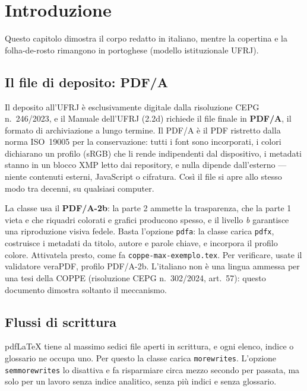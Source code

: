 \documentclass[italian,dsc]{ufrj}
\begin{document}
  \chapter{Introduzione}
  Questo capitolo dimostra il corpo redatto in italiano, mentre la
  copertina e la folha-de-rosto rimangono in portoghese (modello
  istituzionale UFRJ).
  \section{Il file di deposito: PDF/A}
  Il deposito all'UFRJ è esclusivamente digitale dalla risoluzione CEPG
  n.~246/2023, e il Manuale dell'UFRJ (2.2d) richiede il file finale in
  \textbf{PDF/A}, il formato di archiviazione a lungo termine. Il PDF/A è il PDF
  ristretto dalla norma ISO~19005 per la conservazione: tutti i font sono
  incorporati, i colori dichiarano un profilo (sRGB) che li rende indipendenti
  dal dispositivo, i metadati stanno in un blocco XMP letto dai repository, e
  nulla dipende dall'esterno --- niente contenuti esterni, JavaScript o
  cifratura. Così il file si apre allo stesso modo tra decenni, su qualsiasi
  computer.

  La classe usa il \textbf{PDF/A-2b}: la parte 2 ammette la trasparenza, che la
  parte 1 vieta e che riquadri colorati e grafici producono spesso, e il livello
  \emph{b} garantisce una riproduzione visiva fedele. Basta l'opzione
  \texttt{pdfa}: la classe carica \texttt{pdfx}, costruisce i metadati da
  titolo, autore e parole chiave, e incorpora il profilo colore. Attivatela
  presto, come fa \texttt{coppe-max-exemplo.tex}. Per verificare, usate il validatore
  veraPDF, profilo PDF/A-2b. L'italiano non è una lingua ammessa per una tesi
  della COPPE (risoluzione CEPG n.~302/2024, art.~57): questo documento
  dimostra soltanto il meccanismo.

  \section{Flussi di scrittura}
  pdf\LaTeX{} tiene al massimo sedici file aperti in scrittura, e ogni elenco,
  indice o glossario ne occupa uno. Per questo la classe carica
  \texttt{morewrites}. L'opzione \texttt{semmorewrites} lo disattiva e fa
  risparmiare circa mezzo secondo per passata, ma solo per un lavoro senza
  indice analitico, senza più indici e senza glossario.
\end{document}
